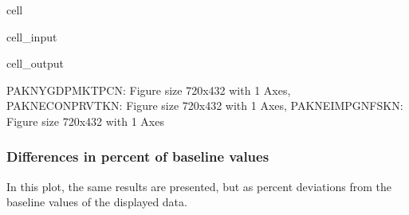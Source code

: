 \documentclass[letterpaper,10pt,english]{jupyterBook}
\begin{document}
\begin{sphinxuseclass}{cell}\begin{sphinxVerbatimInput}

\begin{sphinxuseclass}{cell_input}
\begin{sphinxVerbatim}[commandchars=\\\{\}]
  
\end{sphinxVerbatim}

\end{sphinxuseclass}\end{sphinxVerbatimInput}
\begin{sphinxVerbatimOutput}

\begin{sphinxuseclass}{cell_output}
\begin{sphinxVerbatim}[commandchars=\\\{\}]
\PYGZob{}\PYGZsq{}PAKNYGDPMKTPCN\PYGZsq{}: \PYGZlt{}Figure size 720x432 with 1 Axes\PYGZgt{},
 \PYGZsq{}PAKNECONPRVTKN\PYGZsq{}: \PYGZlt{}Figure size 720x432 with 1 Axes\PYGZgt{},
 \PYGZsq{}PAKNEIMPGNFSKN\PYGZsq{}: \PYGZlt{}Figure size 720x432 with 1 Axes\PYGZgt{}\PYGZcb{}
\end{sphinxVerbatim}

\end{sphinxuseclass}\end{sphinxVerbatimOutput}

\end{sphinxuseclass}

\subsubsection{Differences in percent of baseline values}
\label{\detokenize{content/06_WBModels/ScenarioAnalysis:differences-in-percent-of-baseline-values}}
\sphinxAtStartPar
In this plot, the same results are presented, but as percent deviations from the baseline values of the displayed data.
\end{document}
